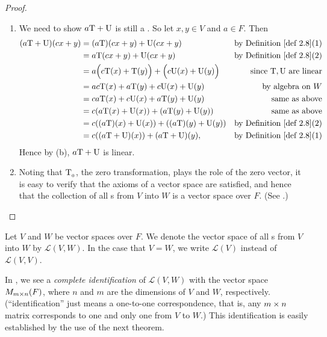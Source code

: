 \begin{proof} \ 
\begin{enumerate}
\item We need to show \(a\mathrm{T} + \mathrm{U}\) is still a \LTRAN{}.
So let \(x, y \in V\) and \(a \in F\).
Then
\begin{align*}
    (a\T + \U)(cx + y) & = (a\T)(cx + y) + \U(cx + y) & \text{by \DEF{2.8}(1)} \\
                       & = a\T(cx + y) + \U(cx + y) & \text{by \DEF{2.8}(2)} \\
                       & = a\Big( c\T(x) + \T(y) \Big) + \Big( c\U(x) + \U(y) \Big) & \text{since \(\T, \U\) are linear} \\
                       & = ac\T(x) + a\T(y) + c\U(x) + \U(y) & \text{by algebra on \(W\)} \\
                       & = ca\T(x) + c\U(x) + a\T(y) + \U(y) & \text{same as above} \\
                       & = c(a\T(x) + \U(x)) + (a\T(y) + \U(y)) &
                       \text{same as above} \\
                       & = c((a\T)(x) + \U(x)) + ((a\T)(y) + \U(y)) & \text{by \DEF{2.8}(2)} \\
                       & = c((a\T + \U)(x)) + (a\T + \U)(y), & \text{by \DEF{2.8}(1)}
\end{align*}
Hence by (b), \(a\mathrm{T} + \mathrm{U}\) is linear.

\item
Noting that \(\mathrm{T}_{_0}\), the zero transformation, plays the role of the zero vector, it is easy to verify that the axioms of a vector space are satisfied, and hence that the collection of all \LTRAN{}s from \(V\) into \(W\) is a vector space over \(F\).
(See \EXEC{2.1.6}.)
\end{enumerate}
\end{proof}

\begin{definition} \label{def 2.9}
Let \(V\) and \(W\) be vector spaces over \(F\).
We denote the vector space of all \LTRAN{}s from \(V\) into \(W\) by \(\mathcal{L}(V, W)\).
In the case that \(V = W\), we write \(\mathcal{L}(V)\) instead of \(\mathcal{L}(V, V)\).
\end{definition}

\begin{remark} \label{remark 2.2.3}
In , we see a \emph{complete identification} of \(\mathcal{L}(V, W)\) with the vector space \(M_{m \times n}(F)\), where \(n\) and \(m\) are the dimensions of \(V\) and \(W\), respectively.
(``identification'' just means a one-to-one correspondence, that is, any \(m \times n\) matrix corresponds to one and only one \LTRAN{} from \(V\) to \(W\).)
This identification is easily established by the use of the next theorem.
\end{remark}

